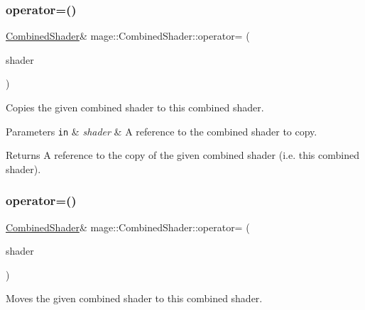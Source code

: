 \subsubsection{\texorpdfstring{operator=()}{operator=()}\hspace{0.1cm}{\footnotesize\ttfamily [1/2]}}
{\footnotesize\ttfamily \hyperlink{structmage_1_1_combined_shader}{Combined\+Shader}\& mage\+::\+Combined\+Shader\+::operator= (\begin{DoxyParamCaption}\item[{const \hyperlink{structmage_1_1_combined_shader}{Combined\+Shader} \&}]{shader }\end{DoxyParamCaption})\hspace{0.3cm}{\ttfamily [default]}}

Copies the given combined shader to this combined shader.


\begin{DoxyParams}[1]{Parameters}
\mbox{\tt in}  & {\em shader} & A reference to the combined shader to copy. \\
\hline
\end{DoxyParams}
\begin{DoxyReturn}{Returns}
A reference to the copy of the given combined shader (i.\+e. this combined shader). 
\end{DoxyReturn}
\hypertarget{structmage_1_1_combined_shader_ad05cf0e2c4f0cd7d37ad5be971aefd1b}{}\label{structmage_1_1_combined_shader_ad05cf0e2c4f0cd7d37ad5be971aefd1b} 
\subsubsection{\texorpdfstring{operator=()}{operator=()}\hspace{0.1cm}{\footnotesize\ttfamily [2/2]}}
{\footnotesize\ttfamily \hyperlink{structmage_1_1_combined_shader}{Combined\+Shader}\& mage\+::\+Combined\+Shader\+::operator= (\begin{DoxyParamCaption}\item[{\hyperlink{structmage_1_1_combined_shader}{Combined\+Shader} \&\&}]{shader }\end{DoxyParamCaption})\hspace{0.3cm}{\ttfamily [default]}}

Moves the given combined shader to this combined shader.


